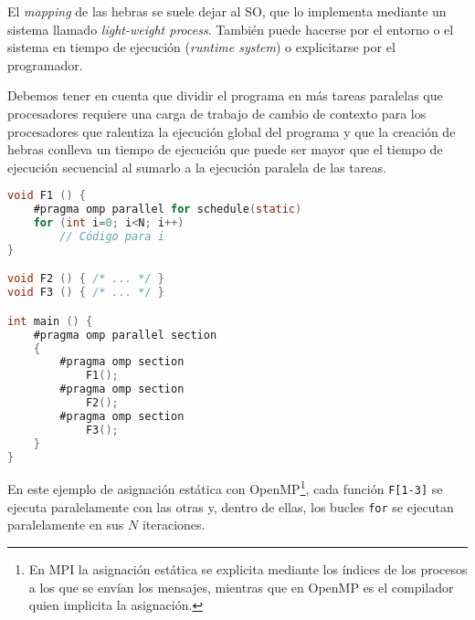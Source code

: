 El \textit{mapping} de las hebras se suele dejar al SO, que lo implementa mediante un sistema llamado \textit{light-weight process}.
También puede hacerse por el entorno o el sistema en tiempo de ejecución (\textit{runtime system}) o explicitarse por el programador.

Debemos tener en cuenta que dividir el programa en más tareas paralelas que procesadores requiere una carga de trabajo de cambio de contexto para los procesadores que ralentiza la ejecución global del programa y que la creación de hebras conlleva un tiempo de ejecución que puede ser mayor que el tiempo de ejecución secuencial al sumarlo a la ejecución paralela de las tareas.

\begin{lstlisting}[language=C]
void F1 () {
	#pragma omp parallel for schedule(static)
	for (int i=0; i<N; i++)
		// Código para i
}

void F2 () { /* ... */ }
void F3 () { /* ... */ }

int main () {
	#pragma omp parallel section
	{
		#pragma omp section
			F1();
		#pragma omp section
			F2();
		#pragma omp section
			F3();
	}
}
\end{lstlisting}

En este ejemplo de asignación estática con OpenMP\footnote{En MPI la asignación estática se explicita mediante los índices de los procesos a los que se envían los mensajes, mientras que en OpenMP es el compilador quien implicita la asignación.}, cada función \texttt{F[1-3]} se ejecuta paralelamente con las otras y, dentro de ellas, los bucles \texttt{for} se ejecutan paralelamente en sus $N$ iteraciones.
